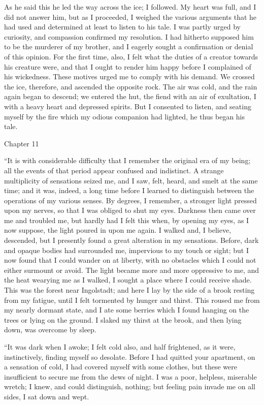 \documentclass[12pt,openright]{book}
\begin{document}
As he said this he led the way across the ice; I followed. My heart was full, and I did not answer him, but as I proceeded, I weighed the various arguments that he had used and determined at least to listen to his tale. I was partly urged by curiosity, and compassion confirmed my resolution. I had hitherto supposed him to be the murderer of my brother, and I eagerly sought a confirmation or denial of this opinion. For the first time, also, I felt what the duties of a creator towards his creature were, and that I ought to render him happy before I complained of his wickedness. These motives urged me to comply with his demand. We crossed the ice, therefore, and ascended the opposite rock. The air was cold, and the rain again began to descend; we entered the hut, the fiend with an air of exultation, I with a heavy heart and depressed spirits. But I consented to listen, and seating myself by the fire which my odious companion had lighted, he thus began his tale.

Chapter 11

“It is with considerable difficulty that I remember the original era of my being; all the events of that period appear confused and indistinct. A strange multiplicity of sensations seized me, and I saw, felt, heard, and smelt at the same time; and it was, indeed, a long time before I learned to distinguish between the operations of my various senses. By degrees, I remember, a stronger light pressed upon my nerves, so that I was obliged to shut my eyes. Darkness then came over me and troubled me, but hardly had I felt this when, by opening my eyes, as I now suppose, the light poured in upon me again. I walked and, I believe, descended, but I presently found a great alteration in my sensations. Before, dark and opaque bodies had surrounded me, impervious to my touch or sight; but I now found that I could wander on at liberty, with no obstacles which I could not either surmount or avoid. The light became more and more oppressive to me, and the heat wearying me as I walked, I sought a place where I could receive shade. This was the forest near Ingolstadt; and here I lay by the side of a brook resting from my fatigue, until I felt tormented by hunger and thirst. This roused me from my nearly dormant state, and I ate some berries which I found hanging on the trees or lying on the ground. I slaked my thirst at the brook, and then lying down, was overcome by sleep.

“It was dark when I awoke; I felt cold also, and half frightened, as it were, instinctively, finding myself so desolate. Before I had quitted your apartment, on a sensation of cold, I had covered myself with some clothes, but these were insufficient to secure me from the dews of night. I was a poor, helpless, miserable wretch; I knew, and could distinguish, nothing; but feeling pain invade me on all sides, I sat down and wept.
\end{document}
